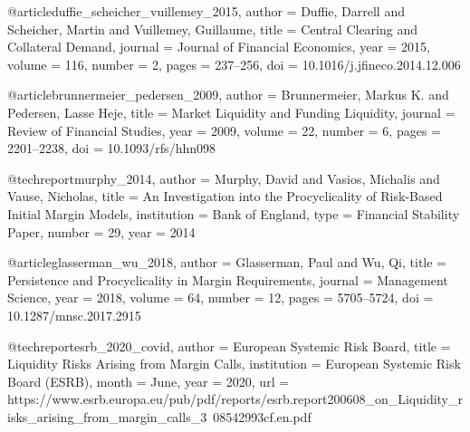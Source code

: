 @article{duffie_scheicher_vuillemey_2015,
  author  = {Duffie, Darrell and Scheicher, Martin and Vuillemey, Guillaume},
  title   = {Central Clearing and Collateral Demand},
  journal = {Journal of Financial Economics},
  year    = {2015}, volume = {116}, number = {2}, pages = {237--256},
  doi     = {10.1016/j.jfineco.2014.12.006}
}


@article{brunnermeier_pedersen_2009,
  author  = {Brunnermeier, Markus K. and Pedersen, Lasse Heje},
  title   = {Market Liquidity and Funding Liquidity},
  journal = {Review of Financial Studies},
  year    = {2009}, volume = {22}, number = {6}, pages = {2201--2238},
  doi     = {10.1093/rfs/hhn098}
}


@techreport{murphy_2014,
  author      = {Murphy, David and Vasios, Michalis and Vause, Nicholas},
  title       = {An Investigation into the Procyclicality of Risk-Based Initial Margin Models},
  institution = {Bank of England}, type = {Financial Stability Paper}, number = {29}, year = {2014}
}


@article{glasserman_wu_2018,
  author  = {Glasserman, Paul and Wu, Qi},
  title   = {Persistence and Procyclicality in Margin Requirements},
  journal = {Management Science},
  year    = {2018}, volume = {64}, number = {12}, pages = {5705--5724},
  doi     = {10.1287/mnsc.2017.2915}
}


@techreport{esrb_2020_covid,
  author      = {{European Systemic Risk Board}},
  title       = {Liquidity Risks Arising from Margin Calls},
  institution = {European Systemic Risk Board (ESRB)}, month = {June}, year = {2020},
  url         = {https://www.esrb.europa.eu/pub/pdf/reports/esrb.report200608_on_Liquidity_risks_arising_from_margin_calls_3~08542993cf.en.pdf}
}


